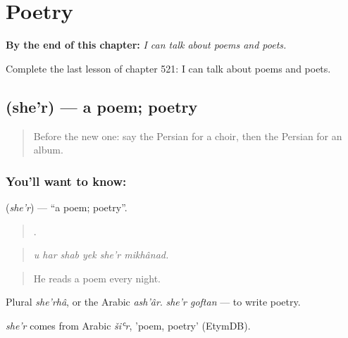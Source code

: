 
\chapter{Poetry}
\label{ch:fa-poetry}

\begin{chapteropening}
\textbf{By the end of this chapter:} \emph{I can talk about poems and poets.}

Complete the last lesson of chapter 521: I can talk about poems and poets.
\end{chapteropening}

\section[\texorpdfstring{\fa{شعر} (she'r)}{شعر (she'r)}]{ (she'r) — a poem; poetry}

\label{lesson:FA-C521-sher}



\begin{quote}
Before the new one: say the Persian for a choir, then the Persian for an album.
\end{quote}

\subsection*{You'll want to know: }
\textbf{} (\emph{she'r}) — \textquotedblleft{}a poem; poetry\textquotedblright{}.

\begin{quote}
     .
\end{quote}

\begin{quote}
\emph{u har shab yek she'r mikhânad.}
\end{quote}

\begin{quote}
He reads a poem every night.
\end{quote}

Plural \emph{she'rhâ}, or the Arabic \emph{ash'âr}. \emph{she'r goftan} — to write poetry.

\begin{cousinweb}
\emph{she'r} comes from Arabic \emph{šiʿr}, 'poem, poetry' (EtymDB).
\end{cousinweb}

